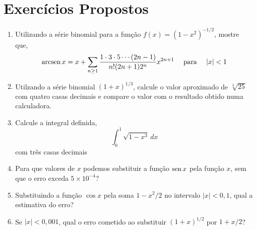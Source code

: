 \section*{Exercícios Propostos}
\begin{enumerate}[label=(\arabic*)]
  \item Utilizando a série binomial para a função $f(x)=(1-x^2)^{-1/2}$, mostre que,
  \begin{equation*}
    \operatorname{arcsen} x = x+\sum_{n \geq 1} \dfrac{1\cdot 3\cdot 5\cdots (2n-1)}{n!(2n+1)2^n}x^{2n+1}   \quad \text{ para } \quad |x|<1
  \end{equation*}
\item Utilzando a série binomial $(1+x)^{1/3}$, calcule o valor aproximado de $\sqrt[3]{25}$ com quatro
casas decimais e compare o valor com o resultado obtido numa calculadora.
\item Calcule a integral definida,
  \begin{equation*}
    \int_{0}^{1}\sqrt{1-x^3}\,dx
  \end{equation*}
  com três casas decimais
\item Para que valores de $x$ podemos substituir a função $\operatorname{sen} x$ pela função $x$, sem que o 
  erro exceda $5\times 10^{-4}$?
\item Substituindo a função $\cos x$ pela soma $1-x^2/2$ no intervalo $|x|<0,1$, qual a estimativa do erro?
\item Se $|x|<0,001$, qual o erro cometido ao substituir $(1+x)^{1/2}$ por $1+x/2$?
\end{enumerate}

